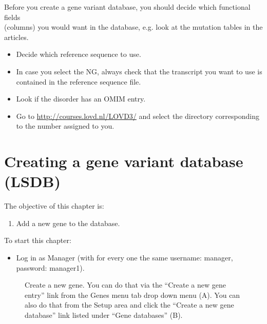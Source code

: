 Before you create a gene variant database, you should decide which functional fields \\
(columns) you would want in the database, e.g. look at the mutation tables in the articles.

\begin{itemize}
	\item 
	Decide which reference sequence to use.
	\item
	In case you select the NG, 
	always check that the transcript you want to use is contained in the reference sequence file.
	\item
	Look if the disorder has an OMIM entry.
	\item
	Go to \url{http://courses.lovd.nl/LOVD3/} and select the directory corresponding to the number assigned to you.
\end{itemize}










\chapter{Creating a gene variant database (LSDB)}
The objective of this chapter is:
\begin{enumerate}
	\item 
	Add a new gene to the database.
\end{enumerate}
To start this chapter:
\begin{itemize}
	\item 
	Log in as Manager (with for every one the same username: manager, password: \linebreak manager1).
\end{itemize}
\begin{figure}[ht]
  \begin{shaded}
	  \caption{Create a new gene.
	  You can do that via the ``Create a new gene entry'' link from the Genes menu tab drop down menu (A). \newline
	  You can also do that from the Setup area and click the ``Create a new gene database'' link listed under
			``Gene databases'' (B).}
		\label{fig:create_gene_I}
  \end{shaded}
\end{figure}

